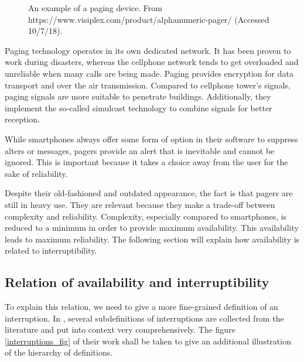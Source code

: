 \documentclass{CML_Seminar_Template}
\begin{document}
\begin{figure}[htb]
  \begin{center}
  \end{center}
    \caption{\label{pager_fig1} An example of a paging device. From https://www.visiplex.com/product/alphanumeric-pager/ (Accessed 10/7/18).}
\end{figure}

Paging technology operates in its own dedicated network. It has been proven to work during disasters, whereas the cellphone network tends to get overloaded and unreliable when many calls are being made. Paging provides encryption for data transport and over the air transmission. Compared to cellphone tower's signals, paging signals are more suitable to penetrate buildings. Additionally, they implement the so-called simulcast technology to combine signals for better reception.
\par
While smartphones always offer some form of option in their software to suppress alters or messages, pagers provide an alert that is inevitable and cannot be ignored. This is important because it takes a choice away from the user for the sake of reliability.
\par
Despite their old-fashioned and outdated appearance, the fact is that pagers are still in heavy use. They are relevant because they make a trade-off between complexity and reliability. Complexity, especially compared to smartphones, is reduced to a minimum in order to provide maximum availability. This availability leads to maximum reliability. The following section will explain how availability is related to interruptibility.

\subsection{Relation of availability and interruptibility}
To explain this relation, we need to give a more fine-grained definition of an interruption. In \cite[]{Fetter2018}, several subdefinitions of interruptions are collected from the literature and put into context very comprehensively. The figure \ref{interruptions_fig} of their work shall be taken to give an additional illustration of the hierarchy of definitions.
\end{document}
